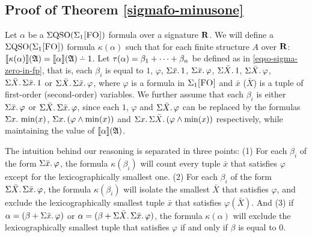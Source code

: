 %
%
	
\subsection{Proof of Theorem \ref{sigmafo-minusone}}

Let $\alpha$ be a $\Sigma{\rm QSO}(\Sigma_{1}\textsc{[FO]})$ formula over a signature $\mathbf{R}$. We will define a $\Sigma{\rm QSO}(\Sigma_{1}\textsc{[FO]})$ formula $\kappa(\alpha)$ such that for each finite structure $A$ over $\mathbf{R}$: $\sem{\kappa(\alpha)}(\A) = \sem{\alpha}(\A) \dotminus 1$. Let $\tau(\alpha) = \beta_1+\cdots+\beta_n$ be defined as in \ref{eqso-sigma-zero-in-fp}, that is, each $\beta_i$ is equal to $1$, $\varphi$, $\Sigma{\bar{x}}.\,1$, $\Sigma{\bar{x}}.\,\varphi$, $\Sigma{\bar{X}}.\,1$, $\Sigma{\bar{X}}.\,\varphi$, $\Sigma{\bar{X}}.\,\Sigma{\bar{x}}.\,1$ or $\Sigma{\bar{X}}.\,\Sigma{\bar{x}}.\,\varphi$, where $\varphi$ is a formula in $\Sigma_{1}\textsc{[FO]}$ and $\bar{x}$ ($\bar{X}$) is a tuple of first-order (second-order) variables. We further assume that each $\beta_i$ is either $\Sigma{\bar{x}}.\,\varphi$ or $\Sigma{\bar{X}}.\,\Sigma{\bar{x}}.\,\varphi$, since each $1$, $\varphi$ and $\Sigma{\bar{X}}.\,\varphi$ can be replaced by the formulas $\Sigma{x}.\,\min(x)$, $\Sigma{x}.\,(\varphi\wedge\min(x))$ and $\Sigma{x}.\,\Sigma{\bar{X}}.\,(\varphi\wedge\min(x))$ respectively, while maintaining the value of ${\llbracket{}{\alpha}\rrbracket}(\mathfrak{A})$. 

The intuition behind our reasoning is separated in three points: (1) For each $\beta_i$ of the form $\Sigma{\bar{x}}.\,\varphi$, the formula $\kappa(\beta_i)$ will count every tuple $\bar{x}$ that satisfies $\varphi$ except for the lexicographically smallest one. (2) For each $\beta_i$ of the form $\Sigma{\bar{X}}.\,\Sigma{\bar{x}}.\,\varphi$, the formula $\kappa(\beta_i)$ will isolate the smallest $\bar{X}$ that satisfies $\varphi$, and exclude the lexicographically smallest tuple $\bar{x}$ that satisfies $\varphi(\bar{X})$. And (3) if $\alpha = (\beta+\Sigma{\bar{x}}.\,\varphi)$ or $\alpha = (\beta+\Sigma{\bar{X}}.\,\Sigma{\bar{x}}.\,\varphi)$, the formula $\kappa(\alpha)$ will exclude the lexicographically smallest tuple that satisfies $\varphi$ if and only if $\beta$ is equal to 0.

